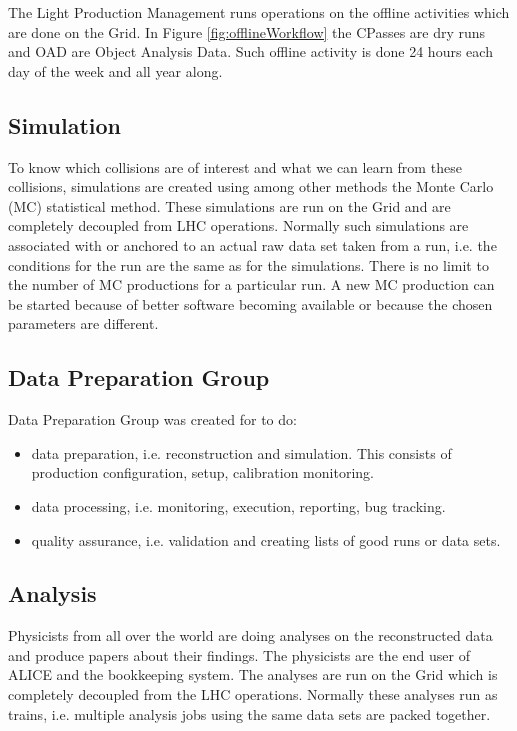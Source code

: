 The Light Production Management runs operations on the offline activities which are done on the Grid. In Figure \ref{fig:offlineWorkflow} the CPasses are dry runs and OAD are Object Analysis Data. Such offline activity is done 24 hours each day of the week and all year along.


\subsection{Simulation}
To know which collisions are of interest and what we can learn from these collisions, simulations are created using among other methods the Monte Carlo (MC) statistical method. These simulations are run on the Grid and are completely decoupled from LHC operations. Normally such simulations are associated with or anchored to an actual raw data set taken from a run, i.e. the conditions for the run are the same as for the simulations. There is no limit to the number of MC productions for a particular run. A new MC production can be started because of better software becoming available or because the chosen parameters are different.


\subsection{Data Preparation Group}
Data Preparation Group was created for to do:
\begin{itemize}
  \item data preparation, i.e. reconstruction and simulation. This consists of production configuration, setup, calibration monitoring.
  \item data processing, i.e. monitoring, execution, reporting, bug tracking.
  \item quality assurance, i.e. validation and creating lists of good runs or data sets.
\end{itemize}




\subsection{Analysis}
Physicists from all over the world are doing analyses on the reconstructed data and produce papers about their findings. The physicists are the end user of ALICE and the bookkeeping system. The analyses are run on the Grid which is completely decoupled from the LHC operations. Normally these analyses run as trains, i.e. multiple analysis jobs using the same data sets are packed together.



